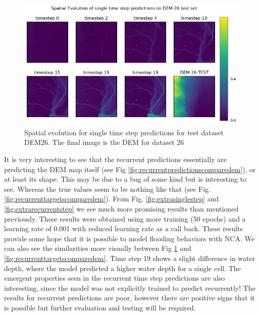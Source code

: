 \begin{figure}[tbph]
	\centering
	\includegraphics[width=0.8\linewidth, height=0.3\textheight]{Figures/Results/extra/SS_predictions_compare_dem}
	\caption[Spatial Evolution of Single Time Step predictions on test dataset DEM 26]{Spatial evolution for single time step predictions for test dataset DEM26. The final image is the DEM for dataset 26}
	\label{fig:sspredictionscomparedem}
\end{figure}


It is very  interesting to see that the recurrent predictions essentially are predicting the DEM map itself (see Fig \ref{fig:recurrentpredictionscomparedem}), or at  least its shape. This may be due to a bug of some kind but is interesting to see. Whereas the true values seem to be nothing like that (see Fig. \ref{fig:recurrenttargetscomparedem}). From Fig. \ref{fig:extrasinglestep} and \ref{fig:extrarecurrentstep} we see much more promising results than mentioned previously. These results were obtained using more training (50 epochs) and a learning rate of 0.001 with reduced learning rate as a call back. These results provide some hope that it is possible to model flooding behaviors with NCA. We can also see the similarities more visually between Fig \ref{fig:sspredictionscomparedem} and \ref{fig:recurrenttargetscomparedem}. Time step 19 shows a slight difference in water depth, where the model predicted a higher water depth for a single cell. The emergent properties seen in the recurrent time step predictions are also interesting, since the model was not explicitly trained to predict recurrently! The results for recurrent predictions are poor, however there are positive signs that it is possible but further evaluation and testing will be required.
